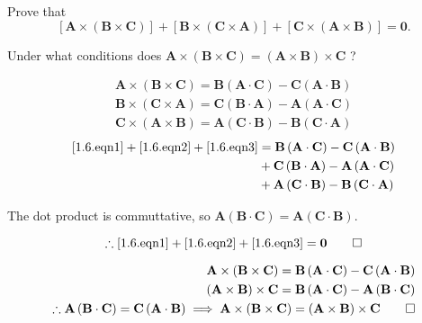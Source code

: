 \begin{hwkProblem}{1.6}{}

	Prove that
	\[
		\left[ \mathbf{A} \times \left( \mathbf{B} \times \mathbf{C} \right) \right] + \left[ \mathbf{B} \times \left( \mathbf{C} \times \mathbf{A} \right) \right] + \left[ \mathbf{C} \times \left( \mathbf{A} \times \mathbf{B} \right) \right] = \mathbf{0} .
	\]

	Under what conditions does \( \mathbf{A} \times \left( \mathbf{B} \times \mathbf{C} \right) = \left( \mathbf{A} \times \mathbf{B} \right) \times \mathbf{C} \) ?

	\hwkSol

	\hwkPart

	\begin{align}
		\mathbf{A} \times \left( \mathbf{B} \times \mathbf{C} \right) = \mathbf{B} \left( \mathbf{A} \cdot \mathbf{C} \right) - \mathbf{C} \left( \mathbf{A} \cdot \mathbf{B} \right) \label{1.6.eqn1} \\
		\mathbf{B} \times \left( \mathbf{C} \times \mathbf{A} \right) = \mathbf{C} \left( \mathbf{B} \cdot \mathbf{A} \right) - \mathbf{A} \left( \mathbf{A} \cdot \mathbf{C} \right) \label{1.6.eqn2} \\
		\mathbf{C} \times \left( \mathbf{A} \times \mathbf{B} \right) = \mathbf{A} \left( \mathbf{C} \cdot \mathbf{B} \right) - \mathbf{B} \left( \mathbf{C} \cdot \mathbf{A} \right) \label{1.6.eqn3}
	\end{align}
	\begin{align*}
		\ref{1.6.eqn1} + \ref{1.6.eqn2} + \ref{1.6.eqn3} & = \mathbf{B} \left( \mathbf{A} \cdot \mathbf{C} \right) - \mathbf{C} \left( \mathbf{A} \cdot \mathbf{B} \right) \\
								 & + \mathbf{C} \left( \mathbf{B} \cdot \mathbf{A} \right) - \mathbf{A} \left( \mathbf{A} \cdot \mathbf{C} \right) \\
								 & + \mathbf{A} \left( \mathbf{C} \cdot \mathbf{B} \right) - \mathbf{B} \left( \mathbf{C} \cdot \mathbf{A} \right) 
	\end{align*}

	The dot product is commuttative, so \( \mathbf{A} \left( \mathbf{B} \cdot \mathbf{C} \right) = \mathbf{A} \left( \mathbf{C} \cdot \mathbf{B} \right) \).

	\[
		\therefore \ref{1.6.eqn1} + \ref{1.6.eqn2} + \ref{1.6.eqn3} = \mathbf{0}
	\qed\]

	\hwkPart

	\begin{align*}
		\mathbf{A} \times \left( \mathbf{B} \times \mathbf{C} \right) = \mathbf{B} \left( \mathbf{A} \cdot \mathbf{C} \right) - \mathbf{C} \left( \mathbf{A} \cdot \mathbf{B} \right) \\
		\left( \mathbf{A} \times \mathbf{B} \right) \times \mathbf{C} = \mathbf{B} \left( \mathbf{A} \cdot \mathbf{C} \right) - \mathbf{A} \left( \mathbf{B} \cdot \mathbf{C} \right) \\
		\therefore \mathbf{A} \left( \mathbf{B} \cdot \mathbf{C} \right) = \mathbf{C} \left( \mathbf{A} \cdot \mathbf{B} \right) \implies \mathbf{A} \times \left( \mathbf{B} \times \mathbf{C} \right) = \left( \mathbf{A} \times \mathbf{B} \right) \times \mathbf{C}
		\qed
	\end{align*}


\end{hwkProblem}
